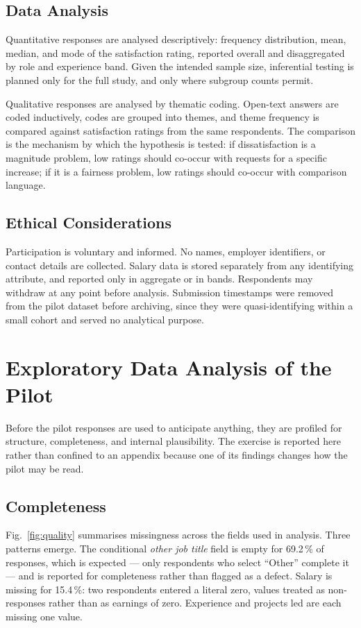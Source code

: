 \documentclass[conference]{IEEEtran}
\begin{document}
\subsection{Data Analysis}

Quantitative responses are analysed descriptively: frequency
distribution, mean, median, and mode of the satisfaction rating, reported
overall and disaggregated by role and experience band. Given the intended
sample size, inferential testing is planned only for the full study, and
only where subgroup counts permit.

Qualitative responses are analysed by thematic coding. Open-text answers
are coded inductively, codes are grouped into themes, and theme frequency
is compared against satisfaction ratings from the same respondents. The
comparison is the mechanism by which the hypothesis is tested: if
dissatisfaction is a magnitude problem, low ratings should co-occur with
requests for a specific increase; if it is a fairness problem, low
ratings should co-occur with comparison language.

\subsection{Ethical Considerations}

Participation is voluntary and informed. No names, employer identifiers,
or contact details are collected. Salary data is stored separately from
any identifying attribute, and reported only in aggregate or in bands.
Respondents may withdraw at any point before analysis. Submission
timestamps were removed from the pilot dataset before archiving, since
they were quasi-identifying within a small cohort and served no
analytical purpose.

\section{Exploratory Data Analysis of the Pilot}

Before the pilot responses are used to anticipate anything, they are
profiled for structure, completeness, and internal plausibility. The
exercise is reported here rather than confined to an appendix because one
of its findings changes how the pilot may be read.

\subsection{Completeness}

Fig.~\ref{fig:quality} summarises missingness across the fields used in
analysis. Three patterns emerge. The conditional \emph{other job title}
field is empty for 69.2\,\% of responses, which is expected --- only
respondents who select ``Other'' complete it --- and is reported for
completeness rather than flagged as a defect. Salary is missing for
15.4\,\%: two respondents entered a literal zero, values
treated as non-responses rather than as earnings of zero. Experience and
projects led are each missing one value.
\end{document}

